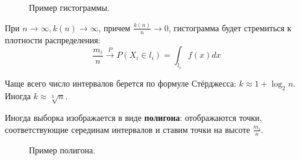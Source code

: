 \begin{figure}[H]
    \centering
    \caption{Пример гистограммы.}
\end{figure}

\begin{theorem}
    При \(n \to \infty, k(n) \to \infty\), причем \(\frac{k(n)}{n} \to 0\), гистограмма будет стремиться к плотности распределения:
    \[\frac{m_i}{n} \xrightarrow{P} P(X_i \in l_i) = \int_{l_i} f(x)dx\]
\end{theorem}
Чаще всего число интервалов берется по формуле Стёрджесса: \(k \approx 1 + \log_2 n\). Иногда \(k \approx \sqrt[3]{n}\).

\begin{remark}
    Иногда выборка изображается в виде \textbf{полигона}: отображаются точки, соответствующие серединам интервалов и ставим точки на высоте \(\frac{m_i}{n}\).
    \begin{figure}[H]
        \centering
        \caption{Пример полигона.}
    \end{figure}
\end{remark}
